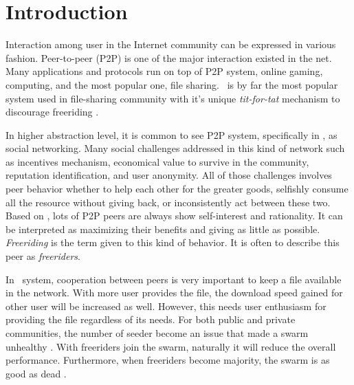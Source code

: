 \chapter{Introduction}
\label{chp:introduction}


%
%
%
%
%

Interaction among user in the Internet community can be expressed in various fashion. Peer-to-peer (P2P) is one of the major interaction existed in the net. Many applications and protocols run on top of P2P system, online gaming, computing, and the most popular one, file sharing. \bt~is by far the most popular system used in file-sharing community with it's unique \textit{tit-for-tat} mechanism to discourage freeriding \cite{2003:bittorrent:cohen}. 

In higher abstraction level, it is common to see P2P system, specifically in \bt, as social networking. Many social challenges addressed in this kind of network such as incentives mechanism, economical value to survive in the community, reputation identification, and user anonymity. All of those challenges involves peer behavior whether to help each other for the greater goods, selfishly consume all the resource without giving back, or inconsistently act between these two. Based on , lots of P2P peers are always show self-interest and rationality. It can be interpreted as maximizing their benefits and giving as little as possible. \textit{Freeriding} is the term given to this kind of behavior. It is often to describe this peer as \textit{freeriders}.

In \bt~system, cooperation between peers is very important to keep a file available in the network. With more user provides the file, the download speed gained for other user will be increased as well. However, this needs user enthusiasm for providing the file regardless of its needs. For both public and private communities, the number of seeder become an issue that made a swarm unhealthy \cite{2010:pubpriv:meulpolder, 2014:sustainabilitytorrent:chen}. With freeriders join the swarm, naturally it will reduce the overall performance. Furthermore, when freeriders become majority, the swarm is as good as dead . 

